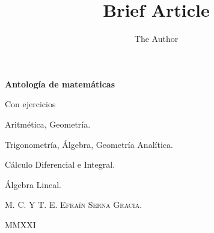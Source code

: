 \documentclass[11pt]{book} %
\title{Brief Article}
\author{The Author}
\begin{document}
\begin{titlepage}
\centering
{\bfseries\LARGE Antología de matemáticas\par}
{Con ejercicios \par}
\vspace{1cm}
{Aritmética, Geometría.\par}
{Trigonometría, Álgebra, Geometría Analítica.\par}
{Cálculo Diferencial e Integral.\par}
{Álgebra Lineal.\par}
\vspace{1in}
{\scshape\Large M. C. Y T. E. Efraín Serna Gracia.\par}
\vfill
{\scshape\Large MMXXI}
\end{titlepage}
\tableofcontents











\end{document}
